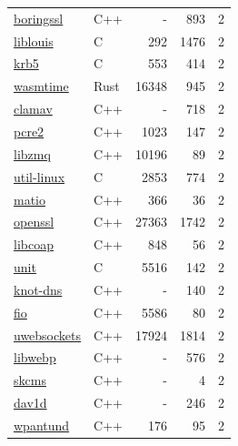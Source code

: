 \begin{table}[p]
\begin{minipage}[t]{.32\textwidth}
{\begin{tabular}[t]{@{}llrrr@{}}
\href{https://boringssl.googlesource.com/boringssl/}{boringssl} & C++ & - & 893 & 2 \\
\href{https://github.com/liblouis/liblouis}{liblouis} & C & 292 & 1476 & 2 \\
\href{https://web.mit.edu/kerberos/}{krb5} & C & 553 & 414 & 2 \\
\href{https://wasmtime.dev/}{wasmtime} & Rust & 16348 & 945 & 2 \\
\href{https://www.clamav.net/}{clamav} & C++ & - & 718 & 2 \\
\href{http://www.pcre.org/}{pcre2} & C++ & 1023 & 147 & 2 \\
\href{https://github.com/zeromq/libzmq}{libzmq} & C++ & 10196 & 89 & 2 \\
\href{https://github.com/util-linux/util-linux}{util-linux} & C & 2853 & 774 & 2 \\
\href{https://github.com/tbeu/matio}{matio} & C++ & 366 & 36 & 2 \\
\href{https://www.openssl.org/}{openssl} & C++ & 27363 & 1742 & 2 \\
\href{https://libcoap.net/}{libcoap} & C++ & 848 & 56 & 2 \\
\href{https://unit.nginx.org}{unit} & C & 5516 & 142 & 2 \\
\href{https://www.knot-dns.cz/}{knot-dns} & C++ & - & 140 & 2 \\
\href{http://git.kernel.dk/fio.git}{fio} & C++ & 5586 & 80 & 2 \\
\href{https://github.com/uNetworking/uWebSockets}{uwebsockets} & C++ & 17924 & 1814 & 2 \\
\href{https://developers.google.com/speed/webp/}{libwebp} & C++ & - & 576 & 2 \\
\href{https://skia.googlesource.com/skcms/+/master}{skcms} & C++ & - & 4 & 2 \\
\href{https://code.videolan.org/videolan/dav1d}{dav1d} & C++ & - & 246 & 2 \\
\href{https://github.com/openthread/wpantund}{wpantund} & C++ & 176 & 95 & 2 \\


\end{tabular}}
\end{minipage}
\end{table}
